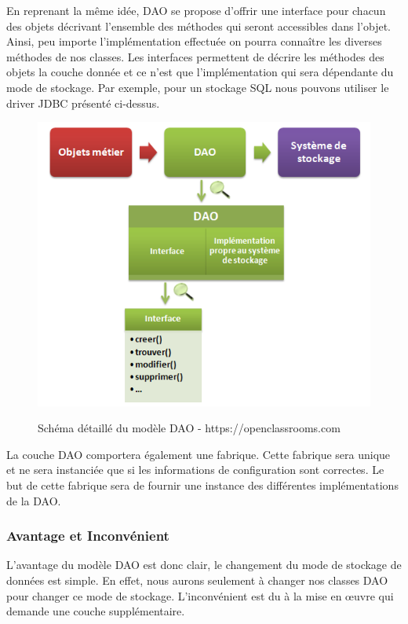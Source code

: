 En reprenant la même idée, DAO se propose d'offrir une interface pour chacun des objets décrivant l'ensemble des méthodes qui seront accessibles dans l'objet. Ainsi, peu importe l'implémentation effectuée on pourra connaître les diverses méthodes de nos classes. Les interfaces permettent de décrire les méthodes des objets la couche donnée et ce n'est que l'implémentation qui sera dépendante du mode de stockage. Par exemple, pour un stockage SQL nous pouvons utiliser le driver JDBC présenté ci-dessus.\\ 
\begin{figure}[H]
  \center
  \includegraphics[scale=0.5]{../graph/dao2.png} \\
  \caption{Schéma détaillé du modèle DAO - https://openclassrooms.com}
\end{figure}

La couche DAO comportera également une fabrique. Cette fabrique sera unique et ne sera instanciée que si les informations de configuration sont correctes. Le but de cette fabrique sera de fournir une instance des différentes implémentations de la DAO.

\subsubsection{Avantage et Inconvénient}
L'avantage du modèle DAO est donc clair, le changement du mode de stockage de données est simple. En effet, nous aurons seulement à changer nos classes DAO pour changer ce mode de stockage. L'inconvénient est du à la mise en œuvre qui demande une couche supplémentaire. 




